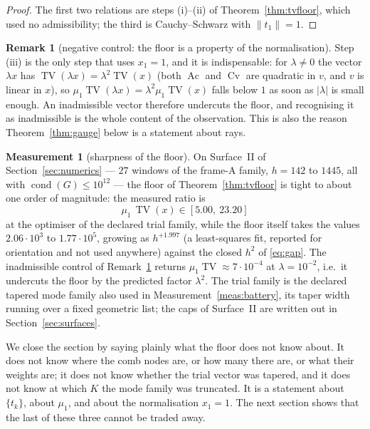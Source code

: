 \documentclass[11pt,a4paper]{article}
\theoremstyle{plain}
\theoremstyle{definition}
\newtheorem{remark}[theorem]{Remark}
\newtheorem{measurement}[theorem]{Measurement}
\newcommand{\cond}{\operatorname{cond}}
\newcommand{\TV}{\operatorname{TV}}
\newcommand{\Ac}{\operatorname{Ac}}
\newcommand{\Cv}{\operatorname{Cv}}
\begin{document}
\begin{proof}
The first two relations are steps (i)--(ii) of Theorem~\ref{thm:tvfloor}, which
used no admissibility; the third is Cauchy--Schwarz with $\lVert t_1\rVert=1$.
\end{proof}

\begin{remark}[negative control: the floor is a property of the normalisation]
\label{rem:negcontrol}
Step (iii) is the only step that uses $x_1=1$, and it is indispensable: for
$\lambda\ne0$ the vector $\lambda x$ has $\TV(\lambda x)=\lambda^{2}\TV(x)$
(both $\Ac$ and $\Cv$ are quadratic in $v$, and $v$ is linear in $x$), so
$\mu_1\TV(\lambda x)=\lambda^{2}\mu_1\TV(x)$ falls below $1$ as soon as
$|\lambda|$ is small enough. An inadmissible vector therefore undercuts the
floor, and recognising it as inadmissible is the whole content of the
observation. This is also the reason Theorem~\ref{thm:gauge} below is a
statement about rays.
\end{remark}

\begin{measurement}[sharpness of the floor]
\label{meas:sharpness}
On Surface~II of Section~\ref{sec:numerics} --- $27$ windows of the frame-A
family, $h=142$ to $1445$, all with $\cond(G)\le10^{12}$ --- the floor of
Theorem~\ref{thm:tvfloor} is tight to about one order of magnitude: the measured
ratio is
\begin{equation}
\label{eq:sharp}
  \mu_1\,\TV(x)\in[5.00,\ 23.20]
\end{equation}
at the optimiser of the declared trial family, while the floor itself takes the
values $2.06\cdot10^{3}$ to $1.77\cdot10^{5}$, growing as $h^{+1.997}$ (a
least-squares fit, reported for orientation and not used anywhere) against the
closed $h^{2}$ of \eqref{eq:gap}. The inadmissible control of
Remark~\ref{rem:negcontrol} returns $\mu_1\TV\approx7\cdot10^{-4}$ at
$\lambda=10^{-2}$, i.e.\ it undercuts the floor by the predicted factor
$\lambda^{2}$.
The trial family is the declared tapered mode family also used in
Measurement~\ref{meas:battery}, its taper width running over a fixed geometric
list; the caps of Surface~II are written out in Section~\ref{sec:surfaces}.
\end{measurement}

We close the section by saying plainly what the floor does not know about. It
does not know where the comb nodes are, or how many there are, or what their
weights are; it does not know whether the trial vector was tapered, and it does
not know at which $K$ the mode family was truncated. It is a statement about
$\{t_k\}$, about $\mu_1$, and about the normalisation $x_1=1$. The next section
shows that the last of these three cannot be traded away.
\end{document}
